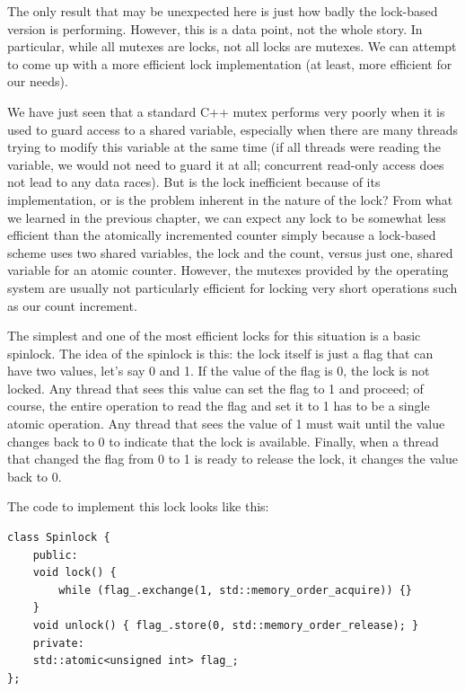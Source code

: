 The only result that may be unexpected here is just how badly the lock-based version is performing. However, this is a data point, not the whole story. In particular, while all mutexes are locks, not all locks are mutexes. We can attempt to come up with a more efficient lock implementation (at least, more efficient for our needs).


We have just seen that a standard C++ mutex performs very poorly when it is used to guard access to a shared variable, especially when there are many threads trying to modify this variable at the same time (if all threads were reading the variable, we would not need to guard it at all; concurrent read-only access does not lead to any data races). But is the lock inefficient because of its implementation, or is the problem inherent in the nature of the lock? From what we learned in the previous chapter, we can expect any lock to be somewhat less efficient than the atomically incremented counter simply because a lock-based scheme uses two shared variables, the lock and the count, versus just one, shared variable for an atomic counter. However, the mutexes provided by the operating system are usually not particularly efficient for locking very short operations such as our count increment.

The simplest and one of the most efficient locks for this situation is a basic spinlock. The idea of the spinlock is this: the lock itself is just a flag that can have two values, let's say 0 and 1. If the value of the flag is 0, the lock is not locked. Any thread that sees this value can set the flag to 1 and proceed; of course, the entire operation to read the flag and set it to 1 has to be a single atomic operation. Any thread that sees the value of 1 must wait until the value changes back to 0 to indicate that the lock is available. Finally, when a thread that changed the flag from 0 to 1 is ready to release the lock, it changes the value back to 0.

The code to implement this lock looks like this:

\begin{lstlisting}[style=styleCXX]
class Spinlock {
	public:
	void lock() {
		while (flag_.exchange(1, std::memory_order_acquire)) {}
	}
	void unlock() { flag_.store(0, std::memory_order_release); }
	private:
	std::atomic<unsigned int> flag_;
};
\end{lstlisting}

